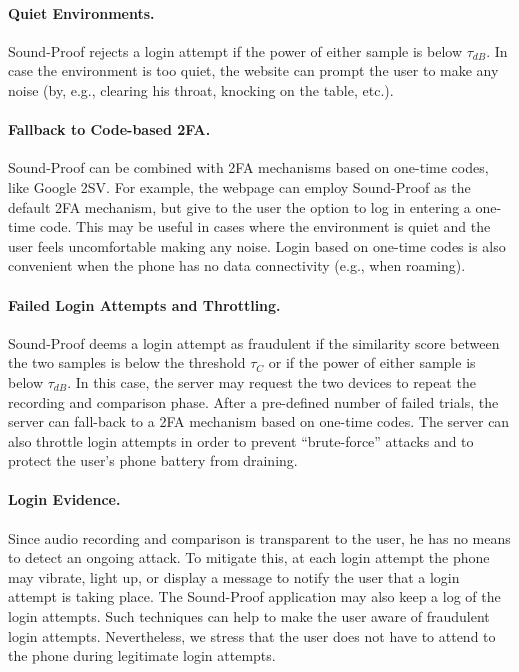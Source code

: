 \paragraph{Quiet Environments.}
Sound-Proof rejects a login attempt if the power of either sample is below $\tau_{dB}$.
In case the environment is too quiet, the website can prompt the user to make any noise (by, e.g., clearing his throat, knocking on the table, etc.).

\paragraph{Fallback to Code-based 2FA.}
Sound-Proof can be combined with 2FA mechanisms based on one-time codes, like Google 2SV.
For example, the webpage can employ Sound-Proof as the default 2FA mechanism, but give to the user the option to log in entering a one-time code.
This may be useful in cases where the environment is quiet and the user feels uncomfortable making any noise.
Login based on one-time codes is also convenient when the phone has no data connectivity (e.g., when roaming).

\paragraph{Failed Login Attempts and Throttling.}
Sound-Proof deems a login attempt as fraudulent if the similarity score between the two samples is below the threshold $\tau_C$ or if the power of either sample is below $\tau_{dB}$.
In this case, the server may request the two devices to repeat the recording and comparison phase.
After a pre-defined number of failed trials, the server can fall-back to a 2FA mechanism based on one-time codes.
The server can also throttle login attempts in order to prevent ``brute-force'' attacks and to protect the user's phone battery from draining.

\paragraph{Login Evidence.}
Since audio recording and comparison is transparent to the user, he has no means to detect an ongoing attack. To mitigate this, at each login attempt the phone may vibrate, light up, or display a message to notify the user that a login attempt is taking place.
The Sound-Proof application may also keep a log of the login attempts.
Such techniques can help to make the user aware of fraudulent login attempts.
Nevertheless, we stress that the user does not have to attend to the phone during legitimate login attempts.


